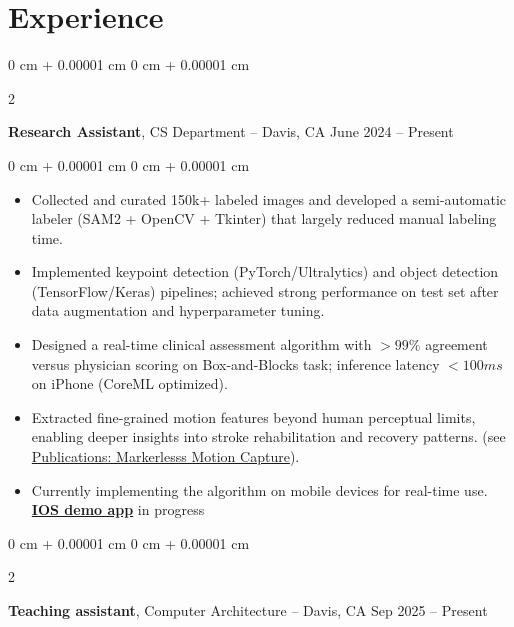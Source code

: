 \documentclass[10pt, letterpaper]{article}
\newenvironment{highlights}{
    \begin{itemize}[
        topsep=0.10 cm,
        parsep=0.10 cm,
        partopsep=0pt,
        itemsep=0pt,
        leftmargin=0 cm + 10pt
    ]
}{
    \end{itemize}
} %
\newenvironment{onecolentry}{
    \begin{adjustwidth}{
        0 cm + 0.00001 cm
    }{
        0 cm + 0.00001 cm
    }
}{
    \end{adjustwidth}
} %
\newenvironment{twocolentry}[2][]{
    \onecolentry
    \def\secondColumn{#2}
    \setcolumnwidth{\fill, 6 cm}
    \begin{paracol}{2}
}{
    \switchcolumn \raggedleft \secondColumn
    \end{paracol}
    \endonecolentry
} %
\begin{document}
    
    \section{Experience}



        
        \begin{twocolentry}{
            June 2024 – Present
        }
            \textbf{Research Assistant}, CS Department -- Davis, CA\end{twocolentry}

        \vspace{0.10 cm}
        \begin{onecolentry}
            \begin{highlights}
                \item Collected and curated 150k+ labeled images and developed a semi-automatic labeler (SAM2 + OpenCV + Tkinter) that largely reduced manual labeling time.
                \item Implemented keypoint detection (PyTorch/Ultralytics) and object detection (TensorFlow/Keras) pipelines; achieved strong performance on test set after data augmentation and hyperparameter tuning.
                \item Designed a real-time clinical assessment algorithm with $>99\%$ agreement versus physician scoring on Box-and-Blocks task; inference latency $<100ms$ on iPhone (CoreML optimized).
                \item Extracted fine-grained motion features beyond human perceptual limits, enabling deeper insights into stroke rehabilitation and recovery patterns. (see \hyperref[pub:markerless-motion-capture]{Publications: Markerlesss Motion Capture}). 
                \item Currently implementing the algorithm on mobile devices for real-time use.  \href{https://github.com/AlundorZhu/CMORE-app}{\textbf{IOS demo app}} in progress
            \end{highlights}
        \end{onecolentry}

        \vspace{0.2 cm}

        \begin{twocolentry}{
            Sep 2025 – Present
        }
            \textbf{Teaching assistant}, Computer Architecture -- Davis, CA\end{twocolentry}
\end{document}
